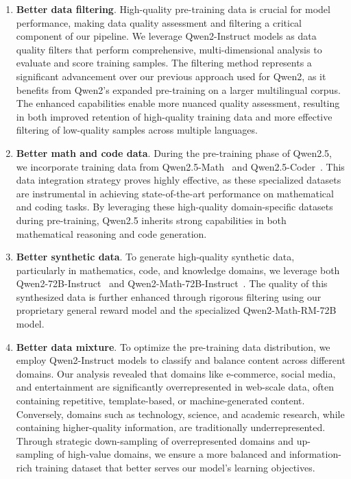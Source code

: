 \documentclass{article}
\begin{document}
\begin{enumerate}[label=(\arabic*)]
    \item \textbf{Better data filtering}. High-quality pre-training data is crucial for model performance, making data quality assessment and filtering a critical component of our pipeline. We leverage Qwen2-Instruct models as data quality filters that perform comprehensive, multi-dimensional analysis to evaluate and score training samples. The filtering method represents a significant advancement over our previous approach used for Qwen2, as it benefits from Qwen2's expanded pre-training on a larger multilingual corpus. The enhanced capabilities enable more nuanced quality assessment, resulting in both improved retention of high-quality training data and more effective filtering of low-quality samples across multiple languages.

    \item \textbf{Better math and code data}. During the pre-training phase of Qwen2.5, we incorporate training data from Qwen2.5-Math~\citep{qwen2.5math} and Qwen2.5-Coder~\citep{qwen2.5coder}. This data integration strategy proves highly effective, as these specialized datasets are instrumental in achieving state-of-the-art performance on mathematical and coding tasks. By leveraging these high-quality domain-specific datasets during pre-training, Qwen2.5 inherits strong capabilities in both mathematical reasoning and code generation.

    \item \textbf{Better synthetic data}. To generate high-quality synthetic data, particularly in mathematics, code, and knowledge domains, we leverage both Qwen2-72B-Instruct~\citep{qwen2} and Qwen2-Math-72B-Instruct~\citep{qwen2math}. The quality of this synthesized data is further enhanced through rigorous filtering using our proprietary general reward model and the specialized Qwen2-Math-RM-72B~\citep{qwen2math} model.

    \item \textbf{Better data mixture}. To optimize the pre-training data distribution, we employ Qwen2-Instruct models to classify and balance content across different domains. Our analysis revealed that domains like e-commerce, social media, and entertainment are significantly overrepresented in web-scale data, often containing repetitive, template-based, or machine-generated content. Conversely, domains such as technology, science, and  academic research, while containing higher-quality information, are traditionally underrepresented. Through strategic down-sampling of overrepresented domains and up-sampling of high-value domains, we ensure a more balanced and information-rich training dataset that better serves our model's learning objectives.
\end{enumerate}
\end{document}
